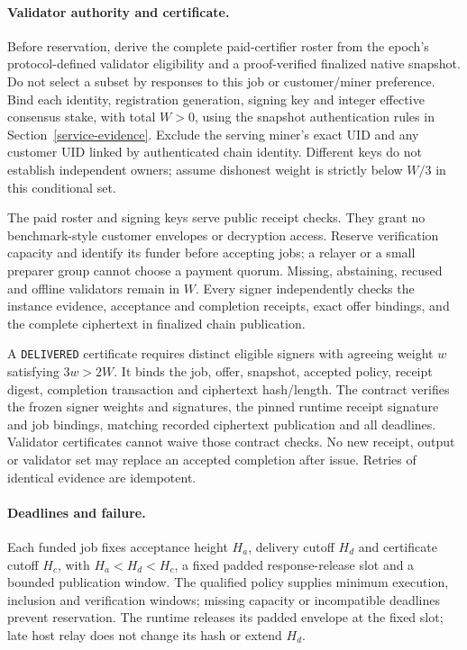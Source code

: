 \paragraph{Validator authority and certificate.}
Before reservation, derive the complete paid-certifier roster from the
epoch's protocol-defined validator eligibility and a proof-verified
finalized native snapshot. Do not select a subset by responses to this
job or customer/miner preference. Bind each identity,
registration generation, signing key and integer effective consensus
stake, with total \(W>0\), using the snapshot authentication rules in
Section~\ref{service-evidence}. Exclude the serving miner's exact UID
and any customer UID linked by authenticated chain identity. Different
keys do not establish independent owners; assume dishonest weight is
strictly below \(W/3\) in this conditional set.

The paid roster and signing keys serve public receipt checks.
They grant no benchmark-style customer envelopes or decryption access.
Reserve verification capacity and identify its funder before accepting
jobs; a relayer or a small preparer group cannot choose a payment quorum.
Missing, abstaining, recused and offline validators remain in \(W\).
Every signer independently checks the instance evidence, acceptance and
completion receipts, exact offer bindings, and the complete ciphertext
in finalized chain publication.

A \texttt{DELIVERED} certificate requires distinct eligible signers with
agreeing weight \(w\) satisfying \(3w>2W\). It binds the job, offer,
snapshot, accepted policy, receipt digest, completion transaction and
ciphertext hash/length. The contract verifies the frozen signer weights
and signatures, the pinned runtime receipt signature and job bindings,
matching recorded ciphertext publication and all deadlines. Validator
certificates cannot waive those contract checks. No new receipt,
output or validator set may replace an accepted completion after issue.
Retries of identical evidence are idempotent.

\paragraph{Deadlines and failure.}
Each funded job fixes acceptance height \(H_a\), delivery cutoff \(H_d\)
and certificate cutoff \(H_c\), with \(H_a<H_d<H_c\), a fixed padded
response-release slot and a bounded publication window. The qualified
policy supplies minimum execution, inclusion and verification windows;
missing capacity or incompatible deadlines prevent reservation. The
runtime releases its padded envelope at the fixed slot; late host
relay does not change its hash or extend \(H_d\).

